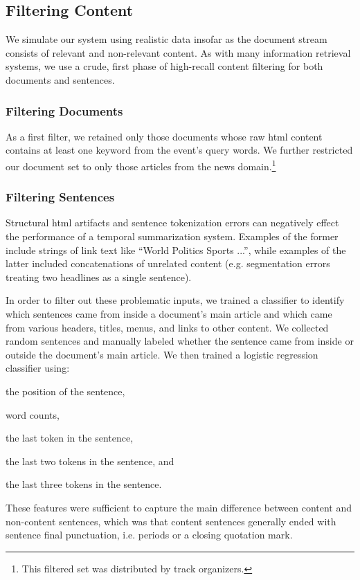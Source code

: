 \subsection{Filtering Content}
\label{sec:filtering}
We simulate our system using realistic data insofar as the document stream consists of relevant and non-relevant content.  As with many information retrieval systems, we use a crude, first phase of high-recall content filtering for both documents and sentences.  

\subsubsection{Filtering Documents}
\label{sec:filtering:documents}
As a first filter, we retained only those documents whose raw html content contains at least one keyword from the event's query words. We further restricted our document set to only those articles from the news domain.\footnote{This filtered set was distributed by track organizers.} 

\subsubsection{Filtering Sentences}
\label{sec:filtering:sentences}
Structural html artifacts and sentence tokenization errors can negatively effect the performance of a temporal summarization system. Examples of the former include strings of link text like ``World Politics Sports ...'', while examples of the latter included concatenations of unrelated content  (e.g. segmentation errors treating two headlines as a single sentence).  


In order to filter out these problematic inputs, we trained a classifier to identify which sentences came from inside a document's main article and which came from various headers, titles, menus, and links to other content. We collected random sentences and manually labeled whether the sentence came from inside or outside the document's main article. We then trained a logistic  regression classifier using: 
\begin{enumerate*}[label=\itshape\alph*\upshape)]
	\item the position of the sentence,
	\item word counts,
	\item the last token in the sentence,
	\item the last two tokens in the sentence, and
	\item the last three tokens in the sentence.
\end{enumerate*}
These features were sufficient to capture the main difference between content and non-content sentences, which  was that content sentences generally ended with sentence final punctuation, i.e. periods or a closing quotation mark. 

